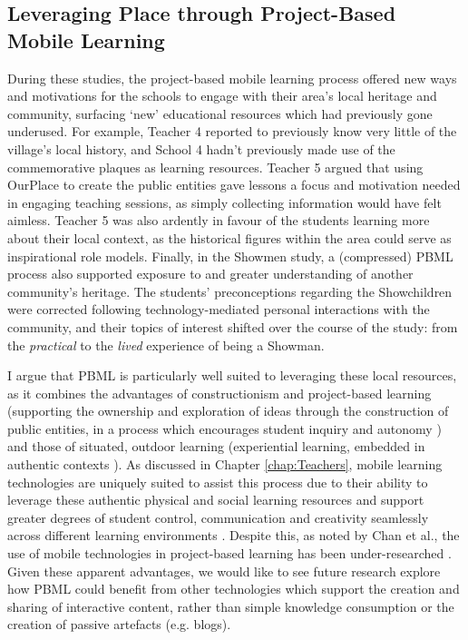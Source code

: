 \subsection{Leveraging Place through Project-Based Mobile Learning}
During these studies, the project-based mobile learning process offered new ways and motivations for the schools to engage with their area's local heritage and community, surfacing `new' educational resources which had previously gone underused. For example, Teacher 4 reported to previously know very little of the village's local history, and School 4 hadn't previously made use of the commemorative plaques as learning resources. Teacher 5 argued that using OurPlace to create the public entities gave lessons a focus and motivation needed in engaging teaching sessions, as simply collecting information would have felt aimless. Teacher 5 was also ardently in favour of the students learning more about their local context, as the historical figures within the area could serve as inspirational role models. Finally, in the Showmen study, a (compressed) PBML process also supported exposure to and greater understanding of another community's heritage. The students' preconceptions regarding the Showchildren were corrected following technology-mediated personal interactions with the community, and their topics of interest shifted over the course of the study: from the \textit{practical} to the \textit{lived} experience of being a Showman.

I argue that PBML is particularly well suited to leveraging these local resources, as it combines the advantages of constructionism and project-based learning (supporting the ownership and exploration of ideas through the construction of public entities, in a process which encourages student inquiry and autonomy \citep{Noss2017, Larmer2015}) and those of situated, outdoor learning (experiential learning, embedded in authentic contexts \citep{Lave1991}). As discussed in Chapter \ref{chap:Teachers}, mobile learning technologies are uniquely suited to assist this process due to their ability to leverage these authentic physical and social learning resources and support greater degrees of student control, communication and creativity seamlessly across different learning environments \citep{Sharples2007}. Despite this, as noted by Chan et al., the use of mobile technologies in project-based learning has been under-researched \citep{Chan2015}. Given these apparent advantages, we would like to see future research explore how PBML could benefit from other technologies which support the creation and sharing of interactive content, rather than simple knowledge consumption or the creation of passive artefacts (e.g. blogs).

